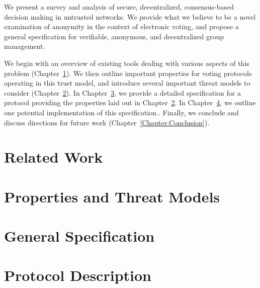 \documentclass[finalcopy,nolof,nolot]{srpaper}
\begin{document}
We present a survey and analysis of secure, decentralized, consensus-based
decision making in untrusted networks. We provide what we believe to be a novel
examination of anonymity in the context of electronic voting, and propose a
general specification for verifiable, anonymous, and decentralized group
management.

We begin with an overview of existing tools dealing with various aspects of this
problem (Chapter~\ref{Chapter:Existing}).  We then outline important properties
for voting protocols operating in this trust model, and introduce several
important threat models to consider (Chapter~\ref{Chapter:Goals}).  In
Chapter~\ref{Chapter:Spec}, we provide a detailed specification for a protocol
providing the properties laid out in Chapter~\ref{Chapter:Goals}. In
Chapter~\ref{Chapter:Protocol}, we outline one potential implementation of this
specification.. Finally, we conclude and discuss
directions for future work (Chapter~\ref{Chapter:Conclusion}).

\chapter{Related Work}\label{Chapter:Existing}


\chapter{Properties and Threat Models}\label{Chapter:Goals}


% 
%
% 
%
\chapter{General Specification}\label{Chapter:Spec}


\chapter{Protocol Description}\label{Chapter:Protocol}

\end{document}
